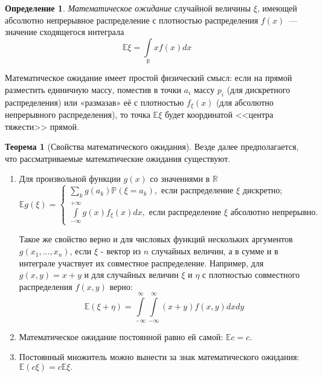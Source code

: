 \documentclass[oneside,final,14pt]{extreport}
\theoremstyle{plain}
\theoremstyle{definition}
\newtheorem*{defn}{Определение}
\theoremstyle{named}
\newtheorem*{namedthm}{Теорема}
\begin{document}
\begin{defn}
    {\it Математическое ожидание} случайной величины $\xi$, имеющей абсолютно непрерывное распределение с плотностью распределения $f(x)$~--- значение сходящегося интеграла
    \begin{equation*}
        \mathbb{E} \xi=\int\limits_{\mathbb{R}} x f(x) dx
    \end{equation*}
\end{defn}

Математическое ожидание имеет простой физический смысл: если на прямой разместить единичную массу, поместив в точки $a_i$ массу $p_i$ (для дискретного распределения) или «размазав» её с плотностью $f_\xi(x)$ (для абсолютно непрерывного распределения), то точка $\mathbb{E}\xi$ будет координатой <<центра тяжести>> прямой.

\begin{namedthm}[Свойства математического ожидания]
    Везде далее предполагается, что рассматриваемые математические ожидания существуют.
\begin{enumerate}
    \item Для произвольной функции $g(x)$ со значениями в $\mathbb{R}$
    $$\mathbb{E} g(\xi)=\left\{\begin{array}{l}\sum\limits_{k} g\left(a_{k}\right) \mathbb{P}\left(\xi=a_{k}\right), \text { если распределение } \xi \text { дискретно; } \\ \int\limits_{-\infty}^{+\infty} g(x) f_{\xi}(x) d x, \text { если распределение } \xi \text { абсолютно непрерывно. }\end{array}\right.$$
    
    Такое же свойство верно и для числовых функций нескольких аргументов $g(x_1, ...,x_n)$, если $\xi$ - вектор из $n$ случайных величин, а в сумме и в интеграле участвует их совместное распределение. Например, для $g(x,y) = x + y$ и для случайных величин $\xi$ и $\eta$ с плотностью совместного распределения $f(x,y)$ верно: 
    \begin{equation}
        \mathbb{E}(\xi+\eta)=\int\limits_{-\infty}^{\infty} \int\limits_{-\infty}^{\infty}(x+y) f(x, y) d x d y
    \end{equation}
    
    \item Математическое ожидание постоянной равно ей самой: $\mathbb{E} c=c.$
    \item Постоянный множитель можно вынести за знак математического ожидания: $\mathbb{E}(c\xi) = c\mathbb{E}\xi.$
    

\end{enumerate}
\end{namedthm}
\end{document}
